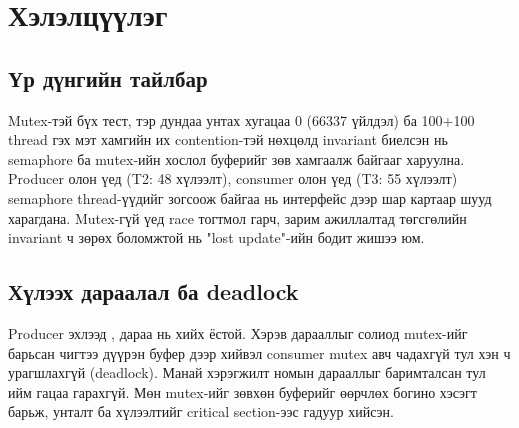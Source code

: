 \documentclass[12pt,a4paper]{article}
\begin{document}

\section{Хэлэлцүүлэг}

\subsection{Үр дүнгийн тайлбар}
Mutex-тэй бүх тест, тэр дундаа унтах хугацаа 0 (66337 үйлдэл) ба 100+100 thread гэх мэт хамгийн их contention-тэй нөхцөлд invariant биелсэн нь semaphore ба mutex-ийн хослол буферийг зөв хамгаалж байгааг харуулна. Producer олон үед  (T2: 48 хүлээлт), consumer олон үед  (T3: 55 хүлээлт) semaphore thread-үүдийг зогсоож байгаа нь интерфейс дээр шар картаар шууд харагдана. Mutex-гүй үед race тогтмол гарч, зарим ажиллалтад төгсгөлийн invariant ч зөрөх боломжтой нь "lost update"-ийн бодит жишээ юм.

\subsection{Хүлээх дараалал ба deadlock}
Producer эхлээд , дараа нь  хийх ёстой. Хэрэв дарааллыг солиод mutex-ийг барьсан чигтээ дүүрэн буфер дээр  хийвэл consumer mutex авч чадахгүй тул хэн ч урагшлахгүй (deadlock). Манай хэрэгжилт номын дарааллыг баримталсан тул ийм гацаа гарахгүй. Мөн mutex-ийг зөвхөн буферийг өөрчлөх богино хэсэгт барьж, унталт ба хүлээлтийг critical section-ээс гадуур хийсэн.
\end{document}
